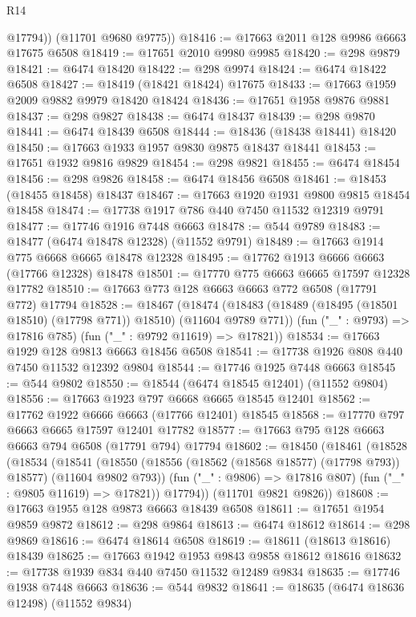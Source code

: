 \begin{lexlean}{R14}
\begin{coremodule}
          @17794))
      (@11701 @9680 @9775))
@18416 := @17663 @2011 @128 @9986 @6663 @17675 @6508
@18419 := @17651 @2010 @9980 @9985
@18420 := @298 @9879
@18421 := @6474 @18420
@18422 := @298 @9974
@18424 := @6474 @18422 @6508
@18427 := @18419 (@18421 @18424) @17675
@18433 := @17663 @1959 @2009 @9882 @9979 @18420 @18424
@18436 := @17651 @1958 @9876 @9881
@18437 := @298 @9827
@18438 := @6474 @18437
@18439 := @298 @9870
@18441 := @6474 @18439 @6508
@18444 := @18436 (@18438 @18441) @18420
@18450 := @17663 @1933 @1957 @9830 @9875 @18437 @18441
@18453 := @17651 @1932 @9816 @9829
@18454 := @298 @9821
@18455 := @6474 @18454
@18456 := @298 @9826
@18458 := @6474 @18456 @6508
@18461 := @18453 (@18455 @18458) @18437
@18467 := @17663 @1920 @1931 @9800 @9815 @18454 @18458
@18474 := @17738 @1917 @786 @440 @7450 @11532 @12319 @9791
@18477 := @17746 @1916 @7448 @6663
@18478 := @544 @9789
@18483 := @18477 (@6474 @18478 @12328) (@11552 @9791)
@18489 := @17663 @1914 @775 @6668 @6665 @18478 @12328
@18495 := @17762 @1913 @6666 @6663 (@17766 @12328) @18478
@18501 := @17770 @775 @6663 @6665 @17597 @12328 @17782
@18510 := @17663 @773 @128 @6663 @6663 @772 @6508 (@17791 @772) @17794
@18528 := @18467
    (@18474
      (@18483 (@18489 (@18495 (@18501 @18510) (@17798 @771)) @18510) (@11604 @9789 @771))
      (fun ("_" : @9793) => @17816 @785)
      (fun ("_" : @9792 @11619) => @17821))
@18534 := @17663 @1929 @128 @9813 @6663 @18456 @6508
@18541 := @17738 @1926 @808 @440 @7450 @11532 @12392 @9804
@18544 := @17746 @1925 @7448 @6663
@18545 := @544 @9802
@18550 := @18544 (@6474 @18545 @12401) (@11552 @9804)
@18556 := @17663 @1923 @797 @6668 @6665 @18545 @12401
@18562 := @17762 @1922 @6666 @6663 (@17766 @12401) @18545
@18568 := @17770 @797 @6663 @6665 @17597 @12401 @17782
@18577 := @17663 @795 @128 @6663 @6663 @794 @6508 (@17791 @794) @17794
@18602 := @18450
    (@18461
      (@18528
        (@18534
          (@18541
            (@18550 (@18556 (@18562 (@18568 @18577) (@17798 @793)) @18577) (@11604 @9802 @793))
            (fun ("_" : @9806) => @17816 @807)
            (fun ("_" : @9805 @11619) => @17821))
          @17794))
      (@11701 @9821 @9826))
@18608 := @17663 @1955 @128 @9873 @6663 @18439 @6508
@18611 := @17651 @1954 @9859 @9872
@18612 := @298 @9864
@18613 := @6474 @18612
@18614 := @298 @9869
@18616 := @6474 @18614 @6508
@18619 := @18611 (@18613 @18616) @18439
@18625 := @17663 @1942 @1953 @9843 @9858 @18612 @18616
@18632 := @17738 @1939 @834 @440 @7450 @11532 @12489 @9834
@18635 := @17746 @1938 @7448 @6663
@18636 := @544 @9832
@18641 := @18635 (@6474 @18636 @12498) (@11552 @9834)

\end{coremodule}
\end{lexlean}
